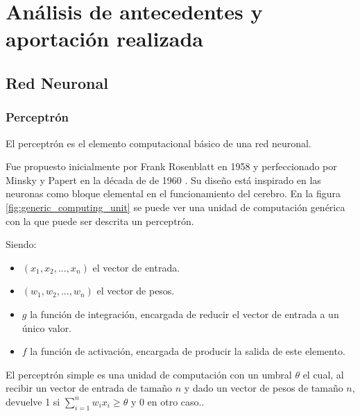 \chapter{An\'alisis de antecedentes y aportaci\'on realizada}\label{analanteced}


\section{Red Neuronal}\label{sec:redneuronal}
\subsection{Perceptrón}\label{subsec:perceptron}

El perceptrón es el elemento computacional básico de una red neuronal.

Fue propuesto inicialmente por Frank Rosenblatt en 1958 y perfeccionado por Minsky y Papert en la década de de 1960 \cite[p.~55-56]{Rojas1996}.
Su diseño está inspirado en las neuronas como bloque elemental en el funcionamiento del cerebro. En la figura \ref{fig:generic_computing_unit} se puede ver una unidad de computación genérica con la que puede ser descrita un perceptrón.


Siendo:
\begin{itemize}
\item $ (x_1, x_2, ...,x_n) $ el vector de entrada.
\item $ (w_1, w_2, ...,w_n) $ el vector de pesos.
\item $ g $ la función de integración, encargada de reducir el vector de entrada a un único valor.
\item $ f $ la función de activación, encargada de producir la salida de este elemento.
\end{itemize}

El perceptrón simple es una unidad de computación con un umbral $ \theta $ el cual, al recibir un vector de entrada de tamaño $ n $ y dado un vector de pesos de tamaño $ n $, devuelve 1 si $ \sum_{i=1}^{n} w_i x_i \geq \theta $ y 0 en otro caso.\cite[p.~60]{Rojas1996}.


